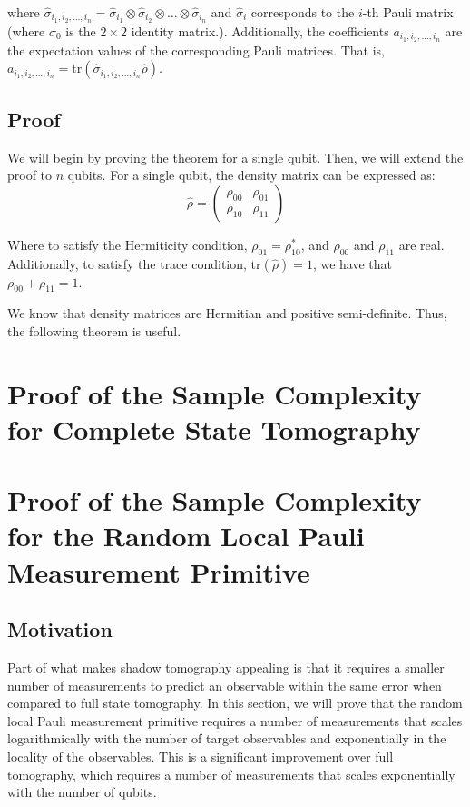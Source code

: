 \documentclass[12pt]{article}
\begin{document}
    where $\hat{\sigma}_{i_1,i_2,\dots,i_n} = \hat{\sigma}_{i_1} \otimes \hat{\sigma}_{i_2} \otimes \dots \otimes \hat{\sigma}_{i_n}$ and $\hat{\sigma}_{i}$ corresponds to the $i$-th Pauli matrix (where $\sigma_0$ is the $2 \times 2$ identity matrix.). Additionally, the coefficients $a_{i_1, i_2, \dots, i_n}$ are the expectation values of the corresponding Pauli matrices. That is, $a_{i_1, i_2, \dots, i_n} = \text{tr}(\hat{\sigma}_{i_1,i_2,\dots,i_n}\hat{\rho})$.

    \subsection{Proof}
    We will begin by proving the theorem for a single qubit. Then, we will extend the proof to $n$ qubits. For a single qubit, the density matrix can be expressed as:
    \begin{equation}
        \hat{\rho} = 
        \begin{pmatrix}
            \rho_{00} & \rho_{01} \\
            \rho_{10} & \rho_{11}
        \end{pmatrix}
    \end{equation}

    Where to satisfy the Hermiticity condition, $\rho_{01} = \rho_{10}^*$, and $\rho_{00}$ and $\rho_{11}$ are real. Additionally, to satisfy the trace condition, $\text{tr}(\hat{\rho}) = 1$, we have that $\rho_{00} + \rho_{11} = 1$. 
    
    We know that density matrices are Hermitian and positive semi-definite. Thus, the following theorem is useful.
    \begin{theorem}
        
    \end{theorem}

    \section{Proof of the Sample Complexity for Complete State Tomography}

    \section{Proof of the Sample Complexity for the Random Local Pauli Measurement Primitive}

    \subsection{Motivation}
    Part of what makes shadow tomography appealing is that it requires a smaller number of measurements to predict an observable within the same error when compared to full state tomography. In this section, we will prove that the random local Pauli measurement primitive requires a number of measurements that scales logarithmically with the number of target observables and exponentially in the locality of the observables. This is a significant improvement over full tomography, which requires a number of measurements that scales exponentially with the number of qubits.
\end{document}

